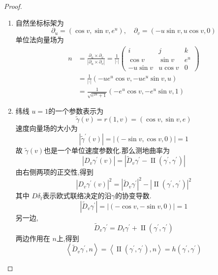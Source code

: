 \documentclass[../../main.tex]{subfiles}
\begin{document}
\begin{proof}
    \begin{enumerate}
        \item 自然坐标标架为 \[
         \partial _{u}= \left( \cos v,\sin v,e^{u} \right),\quad  \partial _{v}= \left( -u\sin v,u\cos v,0 \right)  
        \]单位法向量场为 \[
        \begin{aligned}
        n&= \frac{ \partial_{u}\times  \partial _{v} }{\left|  \partial _{u}\times   \partial _{v} \right|  }  = \frac{1}{\left| \cdot  \right| }\begin{pmatrix} 
            i&j&k\\ 
             \cos v&\sin v&e^{u}\\ 
              -u\sin v&u\cos v&0 
        \end{pmatrix}\\ 
         &= \frac{1 }{\left| \cdot  \right|  }\left( -ue^{u}\cos v,-ue^{u}\sin v,u \right)\\ 
          &=    \frac{1 }{\sqrt{e^{2u}+ 1} }  \left( -e^{u}\cos v,-e^{u}\sin v,1 \right) 
        \end{aligned}
        \]
        \item 纬线 \(  u= 1  \)的一个参数表示为 \[
         \tilde{\gamma}\left( v \right)= r\left( 1,v \right)  = \left( \cos v,\sin v,e \right) 
        \] 速度向量场的大小为 \[
        \left|  \tilde{\gamma} ^{\prime} \left( v \right)  \right|= \left| \left( -\sin v,\cos v,0 \right)  \right|= 1  
        \]故 \(   \tilde{\gamma}   \left( v \right) \)也是一个单位速度参数化.那么测地曲率为\[
        \left| D_{v} \gamma ^{\prime} \left( v \right)  \right|= \left| \tilde{D}_{v} \gamma ^{\prime} -\operatorname{II} \left(  \gamma ^{\prime} , \gamma ^{\prime}  \right)  \right| 
        \]由右侧两项的正交性,得到 \[
        \left| D_{v} \gamma ^{\prime} \left( v \right)  \right|^{2}= \left| \tilde{D}_{v} \gamma ^{\prime}  \right|^{2}- \left| \operatorname{II} \left(  \gamma ^{\prime} , \gamma ^{\prime}  \right)  \right|^{2}   
        \]其中 \(  D \delta _{t}  \)表示欧式联络决定的沿\(   \gamma   \)的协变导数. \[
       \left| \tilde{D}_{v} \gamma ^{\prime}  \right|= \left| \left( -\cos v,-\sin v,0 \right)  \right|= 1  
        \]  另一边, \[
        \tilde{D}_{v} \gamma ^{\prime} = D_{t} \gamma ^{\prime} + \operatorname{II} \left(  \gamma ^{\prime} , \gamma ^{\prime}  \right) 
        \]两边作用在 \(  n  \)上,得到 \[
        \left<\tilde{D}_{v} \gamma ^{\prime} ,n \right>= \left<\operatorname{II} \left(  \gamma ^{\prime} , \gamma ^{\prime}  \right),n  \right>= h\left(  \gamma ^{\prime} , \gamma ^{\prime}  \right) 
\]
\end{enumerate}
\end{proof}
\end{document}
